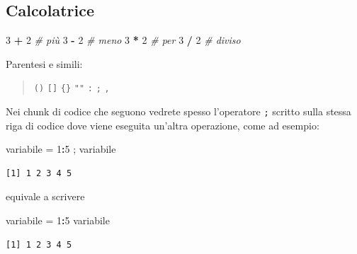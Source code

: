 \documentclass[
  a4paper,
  DIV=11,
  numbers=noendperiod]{scrreprt}
\newenvironment{Shaded}{\begin{snugshade}}{\end{snugshade}}
\newcommand{\CommentTok}[1]{\textcolor[rgb]{0.56,0.35,0.01}{\textit{#1}}}
\newcommand{\DecValTok}[1]{\textcolor[rgb]{0.00,0.00,0.81}{#1}}
\newcommand{\NormalTok}[1]{#1}
\newcommand{\OtherTok}[1]{\textcolor[rgb]{0.56,0.35,0.01}{#1}}
\newcommand{\SpecialCharTok}[1]{\textcolor[rgb]{0.81,0.36,0.00}{\textbf{#1}}}
\begin{document}
\subsection{Calcolatrice}\label{calcolatrice}

\begin{Shaded}
\begin{Highlighting}[]
\DecValTok{3} \SpecialCharTok{+} \DecValTok{2}   \CommentTok{\# più}
\DecValTok{3} \SpecialCharTok{{-}} \DecValTok{2}   \CommentTok{\# meno}
\DecValTok{3} \SpecialCharTok{*} \DecValTok{2}   \CommentTok{\# per}
\DecValTok{3} \SpecialCharTok{/} \DecValTok{2}   \CommentTok{\# diviso}
\end{Highlighting}
\end{Shaded}

Parentesi e simili:

\begin{quote}
\texttt{()} \texttt{{[}{]}} \texttt{\{\}} \texttt{""} \texttt{:}
\texttt{;} \texttt{,}
\end{quote}

\begin{tcolorbox}[enhanced jigsaw, toprule=.15mm, left=2mm, leftrule=.75mm, breakable, coltitle=black, title={ATTENZIONE}, bottomtitle=1mm, opacitybacktitle=0.6, toptitle=1mm, titlerule=0mm, bottomrule=.15mm, colframe=quarto-callout-caution-color-frame, arc=.35mm, rightrule=.15mm, opacityback=0, colbacktitle=quarto-callout-caution-color!10!white, colback=white]

Nei chunk di codice che seguono vedrete spesso l'operatore \texttt{;}
scritto sulla stessa riga di codice dove viene eseguita un'altra
operazione, come ad esempio:

\begin{Shaded}
\begin{Highlighting}[]
\NormalTok{variabile }\OtherTok{=} \DecValTok{1}\SpecialCharTok{:}\DecValTok{5}\NormalTok{ ; variabile}
\end{Highlighting}
\end{Shaded}

\begin{verbatim}
[1] 1 2 3 4 5
\end{verbatim}

equivale a scrivere

\begin{Shaded}
\begin{Highlighting}[]
\NormalTok{variabile }\OtherTok{=} \DecValTok{1}\SpecialCharTok{:}\DecValTok{5} 
\NormalTok{variabile}
\end{Highlighting}
\end{Shaded}

\begin{verbatim}
[1] 1 2 3 4 5
\end{verbatim}

\end{tcolorbox}
\end{document}
